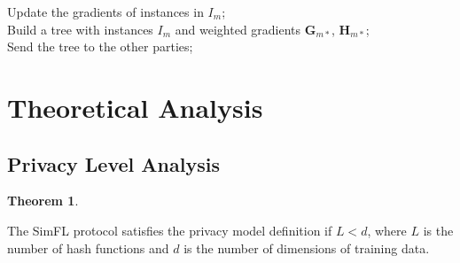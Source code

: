 \documentclass[letterpaper]{article} %
\theoremstyle{definition}
\newtheorem{theorem}{Theorem}
\begin{document}
\begin{algorithm}[t]
\SetNoFillComment
\DontPrintSemicolon
{}
Update the gradients of instances in $I_m$;\\
Build a tree with instances $I_m$ and weighted gradients $\mathbf{G}_{m*}$, $\mathbf{H}_{m*}$;\\
Send the tree to the other parties;
\caption{The process of learning a tree}
\label{alg:boost_tree}
\end{algorithm}

\section{Theoretical Analysis}


\subsection{Privacy Level Analysis}

\begin{theorem}
\label{theorem:secure}

The SimFL protocol satisfies the privacy model definition if $L < d$, where $L$ is the number of hash functions and $d$ is the number of dimensions of training data.
\end{theorem}
\end{document}

